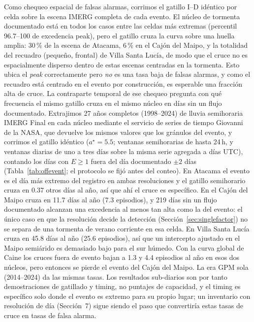 \documentclass[authoryear,preprint,review,12pt]{elsarticle}
\begin{document}
Como chequeo espacial de falsas alarmas, corrimos el gatillo I--D idéntico por
celda sobre la escena IMERG completa de cada evento. El núcleo de tormenta
documentado está en todos los casos entre las celdas más extremas (percentil 96.7--100 de
excedencia peak), pero el gatillo cruza la curva sobre una huella amplia: 30\,\% de
la escena de Atacama, 6\,\% en el Cajón del Maipo, y la totalidad del recuadro
(pequeño, frontal) de Villa Santa Lucía, de modo que el cruce no es espacialmente
disperso dentro de estas escenas centradas en la tormenta. Esto ubica el
\emph{peak} correctamente pero \emph{no} es una tasa baja de falsas alarmas, y como
el recuadro está centrado en el evento por construcción, es esperable una fracción
alta de cruce. La contraparte temporal de ese chequeo pregunta con qué frecuencia el mismo gatillo
cruza en el mismo núcleo en días sin un flujo documentado. Extrajimos 27 años
completos (1998--2024) de lluvia semihoraria IMERG Final en cada núcleo mediante el
servicio de series de tiempo Giovanni de la NASA, que devuelve los mismos valores que
los gránulos del evento, y corrimos el gatillo idéntico ($a^\star=5.5$; ventanas
semihorarias de hasta 24\,h, y ventanas diarias de uno a tres días sobre la misma
serie agregada a días UTC), contando los días con $E\geq1$ fuera del día
documentado $\pm2$ días (Tabla~\ref{tab:offevent}; el protocolo se fijó antes del
conteo). En Atacama el evento es el día más extremo del registro en ambas
resoluciones y el gatillo semihorario cruza en 0.37 otros días al año, así que ahí el
cruce es específico. En el Cajón del Maipo cruza en 11.7 días al año (7.3 episodios),
y 219 días sin un flujo documentado alcanzan una excedencia al menos tan alta como la
del evento: el único caso en que la resolución decide la detección
(Sección~\ref{sec:singlefactor}) no se separa de una tormenta de verano corriente en
esa celda. En Villa Santa Lucía cruza en 45.8 días al año (25.6 episodios), así que
un intercepto ajustado en el Maipo semiárido es demasiado bajo para el sur húmedo.
Con la curva global de Caine los cruces fuera de evento bajan a 1.3 y 4.4 episodios
al año en esos dos núcleos, pero entonces se pierde el evento del Cajón del Maipo.
La era GPM sola (2014--2024) da las mismas tasas. Los resultados sub-diarios son por
tanto demostraciones de gatillado y timing, no puntajes de capacidad, y el timing es
específico solo donde el evento es extremo para su propio lugar; un inventario con
resolución de día (Sección~7) sigue siendo el paso que convertiría estas tasas de
cruce en tasas de falsa alarma.
\end{document}
